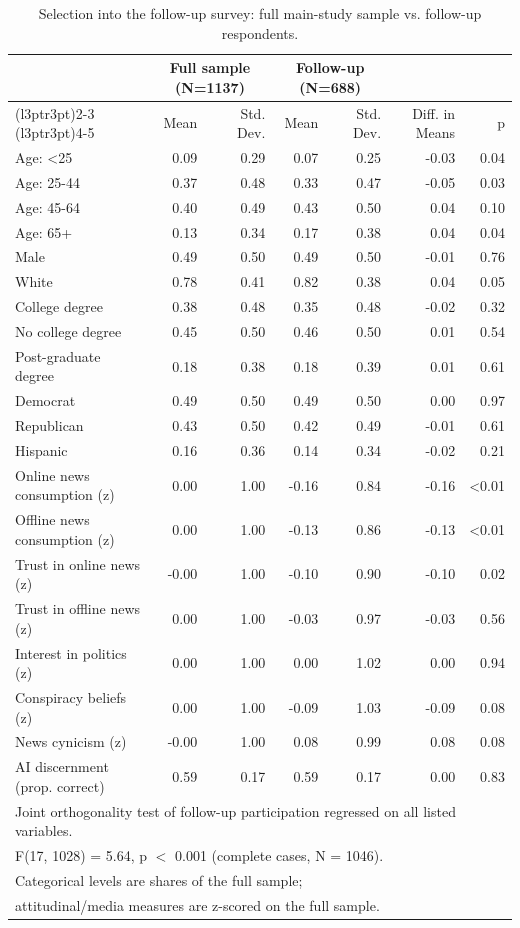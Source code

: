 \begin{table}
\centering
\caption{Selection into the follow-up survey: full main-study sample vs. follow-up respondents.}
\centering
\begin{tabular}[t]{lrrrrrr}
\toprule
\multicolumn{1}{c}{ } & \multicolumn{2}{c}{Full sample (N=1137)} & \multicolumn{2}{c}{Follow-up (N=688)} & \multicolumn{2}{c}{ } \\
\cmidrule(l{3pt}r{3pt}){2-3} \cmidrule(l{3pt}r{3pt}){4-5}
  & Mean & Std. Dev. & Mean & Std. Dev. & Diff. in Means & p\\
\midrule
Age: <25 & 0.09 & 0.29 & 0.07 & 0.25 & -0.03 & 0.04\\
Age: 25-44 & 0.37 & 0.48 & 0.33 & 0.47 & -0.05 & 0.03\\
Age: 45-64 & 0.40 & 0.49 & 0.43 & 0.50 & 0.04 & 0.10\\
Age: 65+ & 0.13 & 0.34 & 0.17 & 0.38 & 0.04 & 0.04\\
Male & 0.49 & 0.50 & 0.49 & 0.50 & -0.01 & 0.76\\
White & 0.78 & 0.41 & 0.82 & 0.38 & 0.04 & 0.05\\
College degree & 0.38 & 0.48 & 0.35 & 0.48 & -0.02 & 0.32\\
No college degree & 0.45 & 0.50 & 0.46 & 0.50 & 0.01 & 0.54\\
Post-graduate degree & 0.18 & 0.38 & 0.18 & 0.39 & 0.01 & 0.61\\
Democrat & 0.49 & 0.50 & 0.49 & 0.50 & 0.00 & 0.97\\
Republican & 0.43 & 0.50 & 0.42 & 0.49 & -0.01 & 0.61\\
Hispanic & 0.16 & 0.36 & 0.14 & 0.34 & -0.02 & 0.21\\
Online news consumption (z) & 0.00 & 1.00 & -0.16 & 0.84 & -0.16 & <0.01\\
Offline news consumption (z) & 0.00 & 1.00 & -0.13 & 0.86 & -0.13 & <0.01\\
Trust in online news (z) & -0.00 & 1.00 & -0.10 & 0.90 & -0.10 & 0.02\\
Trust in offline news (z) & 0.00 & 1.00 & -0.03 & 0.97 & -0.03 & 0.56\\
Interest in politics (z) & 0.00 & 1.00 & 0.00 & 1.02 & 0.00 & 0.94\\
Conspiracy beliefs (z) & 0.00 & 1.00 & -0.09 & 1.03 & -0.09 & 0.08\\
News cynicism (z) & -0.00 & 1.00 & 0.08 & 0.99 & 0.08 & 0.08\\
AI discernment (prop. correct) & 0.59 & 0.17 & 0.59 & 0.17 & 0.00 & 0.83\\
\bottomrule
\multicolumn{7}{l}{\rule{0pt}{1em}Joint orthogonality test of follow-up participation regressed on all listed variables.}\\
\multicolumn{7}{l}{\rule{0pt}{1em}F(17, 1028) = 5.64, p $<$ 0.001 (complete cases, N = 1046).}\\
\multicolumn{7}{l}{\rule{0pt}{1em}Categorical levels are shares of the full sample;}\\
\multicolumn{7}{l}{\rule{0pt}{1em}attitudinal/media measures are z-scored on the full sample.}\\
\end{tabular}
\end{table}
